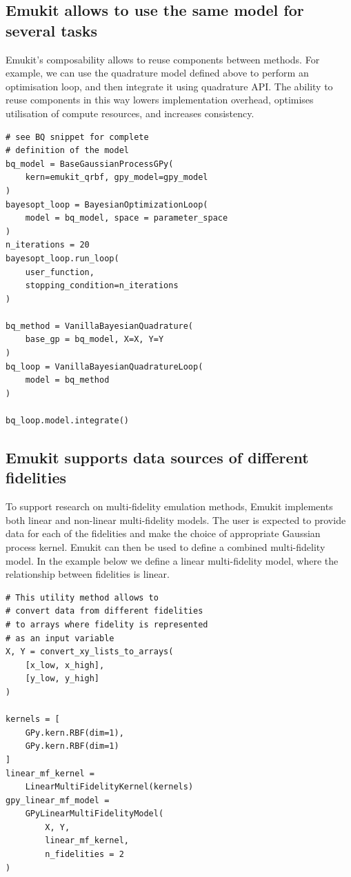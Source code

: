 \subsection{Emukit allows to use the same model for several tasks}

Emukit's composability allows to reuse components between methods. For example, we can use the quadrature model defined above to perform an optimisation loop, and then integrate it using quadrature API. The ability to reuse components in this way lowers implementation overhead, optimises utilisation of compute resources, and increases consistency.

\begin{verbatim}
# see BQ snippet for complete
# definition of the model
bq_model = BaseGaussianProcessGPy(
    kern=emukit_qrbf, gpy_model=gpy_model
)
bayesopt_loop = BayesianOptimizationLoop(
    model = bq_model, space = parameter_space
)
n_iterations = 20
bayesopt_loop.run_loop(
    user_function,
    stopping_condition=n_iterations
)

bq_method = VanillaBayesianQuadrature(
    base_gp = bq_model, X=X, Y=Y
)
bq_loop = VanillaBayesianQuadratureLoop(
    model = bq_method
)

bq_loop.model.integrate()
\end{verbatim}


\subsection{Emukit supports data sources of different fidelities}

To support research on multi-fidelity emulation methods, Emukit implements both linear and non-linear multi-fidelity models.  The user is expected to provide data for each of the fidelities and make the choice of appropriate Gaussian process kernel. Emukit can then be used to define a combined multi-fidelity model. In the example below we define a linear multi-fidelity model, where the relationship between fidelities is linear.

\begin{verbatim}
# This utility method allows to
# convert data from different fidelities
# to arrays where fidelity is represented
# as an input variable
X, Y = convert_xy_lists_to_arrays(
    [x_low, x_high],
    [y_low, y_high]
)

kernels = [
    GPy.kern.RBF(dim=1),
    GPy.kern.RBF(dim=1)
]
linear_mf_kernel =
    LinearMultiFidelityKernel(kernels)
gpy_linear_mf_model =
    GPyLinearMultiFidelityModel(
        X, Y,
        linear_mf_kernel,
        n_fidelities = 2
)
\end{verbatim}

